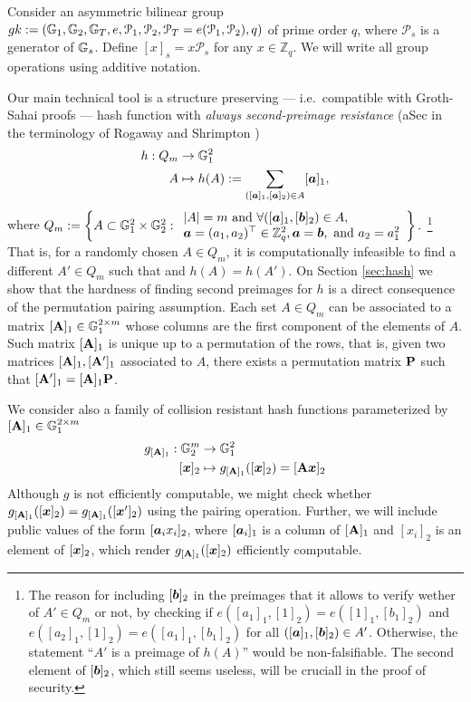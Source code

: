 
Consider an asymmetric bilinear group $gk:=(\mathbb{G}_1,\mathbb{G}_2,\mathbb{G}_T,e,\mathcal{P}_1,\mathcal{P}_2,\mathcal{P}_T=e(\mathcal{P}_1,\mathcal{P}_2),q)$ of prime order $q$, where $\mathcal{P}_s$ is a generator of $\mathbb{G}_s$. Define $[x]_s=x\mathcal{P}_s$ for any $x\in\mathbb{Z}_q$.  We will write all group operations using additive notation.

Our main technical tool is a structure preserving --- i.e.~compatible with Groth-Sahai proofs --- hash function with \emph{always second-preimage resistance} (aSec in the terminology of Rogaway and Shrimpton \cite{FSE:RogShr04})
\begin{align*}
h : Q_m &\to \mathbb{G}^2_1\\
      A &\mapsto h(A) := \sum_{([{\boldsymbol{a}}]_1,[{\boldsymbol{a}}]_2)\in A} [{\boldsymbol{a}}]_1,
\end{align*}
 where
$
Q_m:= \left\{A\subset\mathbb{G}^2_1\times\mathbb{G}_2^2:
\begin{array}{l}
 |A|=m \text{ and }\forall ([{\boldsymbol{a}}]_1,[{\boldsymbol{b}}]_2)\in A,\\
{\boldsymbol{a}}=(a_1,a_2)^\top\in\mathbb{Z}_q^2, {\boldsymbol{a}}={\boldsymbol{b}}, \text{ and } a_2=a_1^2
\end{array}\right\}.
$
\footnote{The reason for including $[{\boldsymbol{b}}]_2$ in the preimages that it allows to verify wether of $A'\in Q_m$ or not, by checking if $e([a_1]_1,[1]_2)=e([1]_1,[{b}_1]_2)$ and $e([a_2]_1,[1]_2)=e([a_1]_1,[b_1]_2)$ for all $([{\boldsymbol{a}}]_1,[{\boldsymbol{b}}]_2)\in A'$. Otherwise, the statement ``$A'$ is a preimage of $h(A)$'' would be non-falsifiable. The second element of $[{\boldsymbol{b}}]_2$, which still seems useless, will be cruciall in the proof of security.} 
That is, for a randomly chosen $A\in Q_m$, it is computationally infeasible to find a different $A'\in Q_m$ such that and $h(A)=h(A')$. On Section \ref{sec:hash} we show that the hardness of finding second preimages for $h$ is a direct consequence of the permutation pairing assumption.
Each set $A\in Q_m$  can be associated to a matrix $[\mathbf{{A}}]_1\in \mathbb{G}^{2\times m}_1$ whose columns are the first component of the elements of $A$. Such matrix $[\mathbf{{A}}]_1$ is unique up to a permutation of the rows, that is, given two matrices $[\mathbf{{A}}]_1,[\mathbf{{A}}']_1$ associated to $A$, there exists a permutation matrix $\mathbf{{P}}$ such that $[\mathbf{{A}}']_1 = [\mathbf{{A}}]_1\mathbf{{P}}$.

We consider also a family of collision resistant hash functions parameterized by $[\mathbf{{A}}]_1\in\mathbb{G}^{2\times m}_1$
\begin{align*}
g_{[\matr{A}]_1} : \GG^m_2 &\to \GG^2_1\\
           [\vecb{x}]_2 &\mapsto g_{[\matr{A}]_1}([\vecb{x}]_2) = [\matr{A}\vecb{x}]_2
\end{align*}
Although $g$ is not efficiently computable, we might check whether $g_{[\mathbf{{A}}]_1}([{\boldsymbol{x}}]_2)=g_{[\mathbf{{A}}]_1}([{\boldsymbol{x}}']_2)$ using the pairing operation. Further, we will include public values of the form $[{\boldsymbol{a}}_ix_i]_2$, where $[{\boldsymbol{a}}_i]_1$ is a column of $[\mathbf{{A}}]_1$ and $[x_i]_2$ is an element of $[{\boldsymbol{x}}]_2$, which render  $g_{[\mathbf{{A}}]_1}([{\boldsymbol{x}}]_2)$ efficiently computable.

